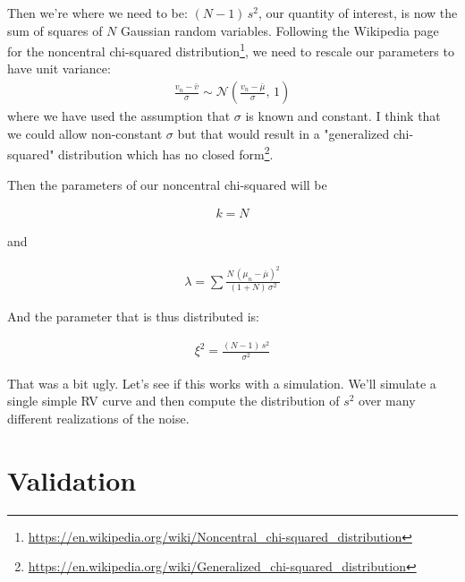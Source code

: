 \documentclass[modern, letterpaper]{aastex631}
\begin{document}
Then we're where we need to be: $(N - 1)\,s^2$, our quantity of interest, is now the sum of squares of $N$ Gaussian random variables.
Following the Wikipedia page for the noncentral chi-squared distribution\footnote{\url{https://en.wikipedia.org/wiki/Noncentral_chi-squared_distribution}}, we need to rescale our parameters to have unit variance:
\begin{eqnarray}
	\frac{v_n - \bar{v}}{\sigma} \sim \mathcal{N}\left(\frac{v_n - \bar{\mu}}{\sigma},\,1\right)
\end{eqnarray}
where we have used the assumption that $\sigma$ is known and constant.
I think that we could allow non-constant $\sigma$ but that would result in a "generalized chi-squared" distribution which has no closed form\footnote{\url{https://en.wikipedia.org/wiki/Generalized_chi-squared_distribution}}.

Then the parameters of our noncentral chi-squared will be

\begin{eqnarray}
	k = N
\end{eqnarray}

and

\begin{eqnarray}
	\lambda = \sum \frac{N\,(\mu_n - \bar{\mu})^2}{(1 + N)\,\sigma^2}
\end{eqnarray}

And the parameter that is thus distributed is:

\begin{eqnarray}
	\xi^2 = \frac{(N - 1)\,s^2}{\sigma^2}
\end{eqnarray}

That was a bit ugly.
Let's see if this works with a simulation.
We'll simulate a single simple RV curve and then compute the distribution of $s^2$ over many different realizations of the noise.




\section{Validation}
\end{document}
